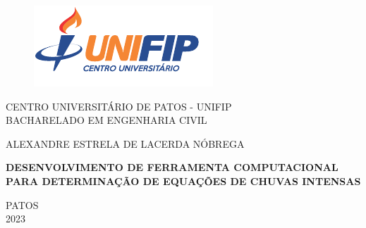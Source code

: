 	\begin{figure}[!ht]
		\centering
		\includegraphics[scale=1]{figuras/UNIFIP}
	\end{figure}
	\vspace{-1cm}
	
	\begin{center}
			CENTRO UNIVERSITÁRIO DE PATOS - UNIFIP\\
			BACHARELADO EM ENGENHARIA CIVIL
	\end{center}
	\vspace{4cm}
	
	
	\begin{center}
		ALEXANDRE ESTRELA DE LACERDA NÓBREGA
	\end{center}
	
	
	\vspace{4cm}
	
	\begin{center}
		{\large \textbf{DESENVOLVIMENTO DE FERRAMENTA COMPUTACIONAL PARA DETERMINAÇÃO DE EQUAÇÕES DE CHUVAS INTENSAS}}
	\end{center}
	
	
	
	\vfill
	
	\begin{center}
		PATOS \\
		2023
	\end{center}
	\newpage
